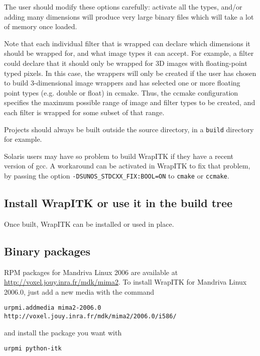 \documentclass{InsightArticle}
\begin{document}
The user should modify these options carefully: activate all the types, and/or
adding many dimensions will produce very large binary files which will take a lot
of memory once loaded.

Note that each individual filter that is wrapped can declare which dimensions it
should be wrapped for, and what image types it can accept. For example, a filter
could declare that it should only be wrapped for 3D images with floating-point
typed pixels. In this case, the wrappers will only be created if the user has
chosen to build 3-dimensional image wrappers and has selected one or more
floating point types (e.g. double or float) in ccmake. Thus, the ccmake
configuration specifies the maximum possible range of image and filter types to
be created, and each filter is wrapped for some subset of that range. 

Projects should always be built outside the source directory, in a \verb$build$
directory for example.

Solaris users may have so problem to build WrapITK if they have a recent version of
gcc. A workaround can be activated in WrapITK to fix that problem, by passing the
option \verb$-DSUNOS_STDCXX_FIX:BOOL=ON$ to \verb$cmake$ or \verb$ccmake$.

    \subsection{Install WrapITK or use it in the build tree}

Once built, WrapITK can be installed or used in place.

    \subsection{Binary packages}

RPM packages for Mandriva Linux 2006 are available at \url{http://voxel.jouy.inra.fr/mdk/mima2}.
To install WrapITK for Mandriva Linux 2006.0, just add a new media with the
command

\begin{verbatim}
urpmi.addmedia mima2-2006.0 http://voxel.jouy.inra.fr/mdk/mima2/2006.0/i586/
\end{verbatim}

and install the package you want with 

\begin{verbatim}
urpmi python-itk
\end{verbatim}
\end{document}
